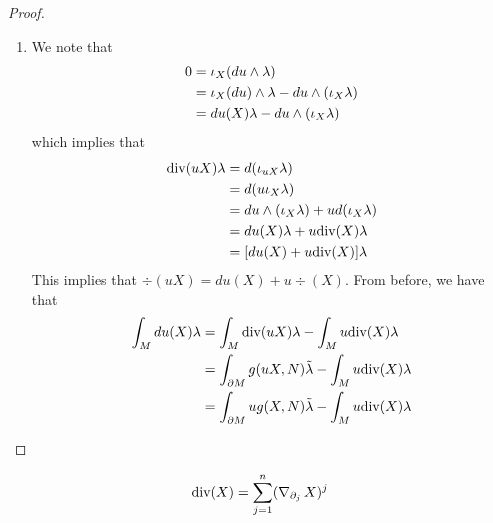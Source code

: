 \documentclass{book}
\begin{document}
\begin{proof}
\begin{enumerate}
\begin{align*}
			& = g(X,N) \ep^1 \wedge \ldots \wedge \ep^{n-1}(X_1, \ldots, X_{n-1}) \\
			& =  g(X, N) \tilde{\lam}(X_1, \ldots, X_n) 
		\end{align*}
		Therefore $	\iota^* \iota_X \lam  = g(X,N) \tilde{\lam}$ and 
		\begin{align*}
			\int_M \div X \lam 
			& = \int_M d(\iota_X \lam) \\
			& = \int_{\p M} \iota^* (\iota_X \lam) \\
			& = \int_{\p M} g(X, N) \tilde{\lam}
		\end{align*}
		\item We note that
		\begin{align*}
			0
			& = \iota_X(d u \wedge \lambda) \\
			& = \iota_X(du) \wedge \lambda - du \wedge (\iota_X \lambda) \\
			& = du(X) \lambda  - du \wedge (\iota_X \lambda) 
		\end{align*} 
		which implies that 
		\begin{align*}
			\text{div} (uX) \lambda 
			& = d(\iota_{uX} \lambda) \\
			& = d (u \iota_X \lambda) \\
			& = du \wedge (\iota_X \lambda) + u d(\iota_X \lambda ) \\
			& = du(X) \lambda + u \text{div}(X) \lambda \\
			& = [du(X) + u \text{div}(X)] \lambda 
		\end{align*}
		This implies that $	\div (uX) = du(X) + u \div(X)$. From before, we have that 
		\begin{align*}
			\int_M du(X) \lambda 
			& = \int_M \text{div} (uX) \lambda - \int_M u \text{div}(X) \lambda \\
			& = \int_{\partial M} g(uX, N) \tilde{\lambda} - \int_M u \text{div}(X) \lambda \\
			& = \int_{\partial M} u g(X, N) \tilde{\lambda} - \int_M u \text{div}(X) \lambda \\
		\end{align*}
	\end{enumerate}
\end{proof}


\begin{ex}
	$$\text{div}(X) = \sum_{j = 1}^n (\operatorname{\nabla}_{\partial_j} X)^j$$
\end{ex}
\end{document}
